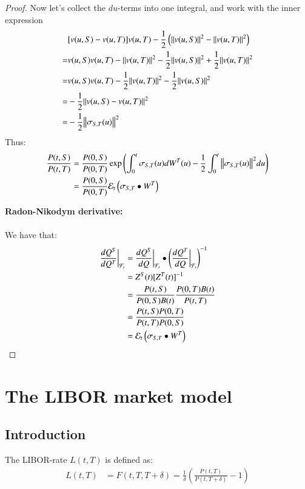 \begin{proof}
\newpage 

Now let's collect the $du$-terms into one integral, and work with the inner expression 
\begin{align*}
&[v(u,S)-v(u,T)]v(u,T) -\frac{1}{2}\left(\norm{v(u,S)}^{2}-\norm{v(u,T)}^{2}\right) \\
=& 
v(u,S)v(u,T)-\norm{v(u,T)}^{2} -\frac{1}{2}\norm{v(u,S)}^{2} + \frac{1}{2}\norm{v(u,T)}^{2} \\ 
=& 
v(u,S)v(u,T)-\frac{1}{2}\norm{v(u,T)}^{2} - \frac{1}{2}\norm{v(u,S)}^{2} \\ 
=& 
-\frac{1}{2}\norm{v(u,S)-v(u,T)}^{2} \\ 
=& -\frac{1}{2}\norm{\sigma_{S,T}(u)}^{2}
\end{align*}
Thus: 
\begin{align*}
\frac{P(t,S)}{P(t,T)}
&= 
\frac{P(0,S)}{P(0,T)}\exp\left(
\int_{0}^{t}\sigma_{S,T}(u)dW^{T}(u) -\frac{1}{2}\int_{0}^{t}\norm{\sigma_{S,T}(u)}^{2}du 
\right) \\ 
&= 
\frac{P(0,S)}{P(0,T)}\mathcal{E}_{t}\left(
\sigma_{S,T}\bullet W^{T}
\right)
\end{align*}

\textbf{Radon-Nikodym derivative:}
\\~\\ 
We have that: 
\begin{align*}
\frac{dQ^{S}}{dQ^{T}}\bigg{|}_{\mathcal{F}_{t}} 
&= 
\frac{dQ^{S}}{dQ}\bigg{|}_{\mathcal{F}_{t}}\bullet\left(
\frac{dQ^{T}}{dQ}\bigg{|}_{\mathcal{F}_{t}}
\right)^{-1} \\ 
&= 
Z^{S}(t)[Z^{T}(t)]^{-1} \\ 
&= 
\frac{P(t,S)}{P(0,S)B(t)}\frac{P(0,T)B(t)}{P(t,T)} \\ 
&= 
\frac{
P(t,S)P(0,T)
}{
P(t,T)P(0,S)
} \\ 
&= 
\mathcal{E}_{t}\left(
\sigma_{S,T}\bullet W^{T}
\right)
\end{align*}
\end{proof}

\newpage 
\section{The LIBOR market model}

\subsection{Introduction}

\begin{definition}
The LIBOR-rate  $L(t,T)$ 
is defined as: 
 \begin{align*}
L(t,T) &= F(t,T,T+\delta) 
= \frac{1}{\delta}\left(
\frac{P(t,T)}{P(t,T+\delta)}-1
\right)     
 \end{align*}
\end{definition}

